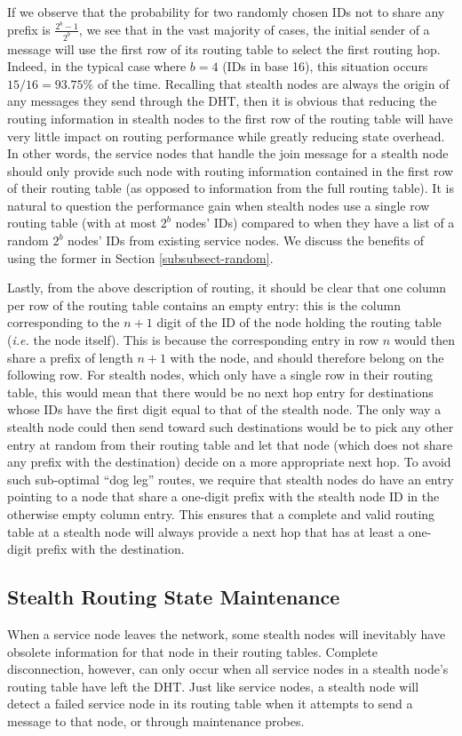 \documentclass[letterpaper]{sig-alternate} %
\begin{document}
If we observe that the probability for two randomly chosen IDs not to share any
prefix is $\frac{2^b - 1}{2^b}$, we see that in the vast majority of cases, the
initial sender of a message will use the first row of its routing table to
select the first routing hop. Indeed, in the typical case where $b = 4$ (IDs in
base 16), this situation occurs $15/16 = 93.75\%$ of the time. Recalling that
stealth nodes are always the origin of any messages they send through the DHT,
then it is obvious that reducing the routing information in stealth nodes to
the first row of the routing table will have very little impact on routing
performance while greatly reducing state overhead. In other words, the service
nodes that handle the join message for a stealth node should only provide such
node with routing information contained in the first row of their routing table
(as opposed to information from the full routing table). It is natural to
question the performance gain when stealth nodes use a single row routing table
(with at most $2^b$ nodes' IDs) compared to when they have a list of a random
$2^b$ nodes' IDs from existing service nodes. We discuss the benefits of using
the former in Section \ref{subsubsect-random}.

Lastly, from the above description of routing, it should be clear
that one column per row of the routing table contains an empty
entry: this is the column corresponding to the $n+1$ digit of the ID
of the node holding the routing table (\emph{i.e.} the node itself).
This is because the corresponding entry in row $n$ would then share
a prefix of length $n+1$ with the node, and should therefore belong
on the following row. For stealth nodes, which only have a single
row in their routing table, this would mean that there would be no
next hop entry for destinations whose IDs have the first digit equal
to that of the stealth node. The only way a stealth node could then
send toward such destinations would be to pick any other entry at
random from their routing table and let that node (which does not
share any prefix with the destination) decide on a more appropriate
next hop. To avoid such sub-optimal ``dog leg'' routes, we require
that stealth nodes do have an entry pointing to a node that share a
one-digit prefix with the stealth node ID in the otherwise empty
column entry. This ensures that a complete and valid routing table
at a stealth node will always provide a next hop that has at least a
one-digit prefix with the destination.

\subsection{Stealth Routing State Maintenance}
When a service node leaves the network, some stealth nodes will
inevitably have obsolete information for that node in their routing
tables. Complete disconnection, however, can only occur when all
service nodes in a stealth node's routing table have left the DHT.
Just like service nodes, a stealth node will detect a failed service
node in its routing table when it attempts to send a message to that
node, or through maintenance probes.
\end{document}
